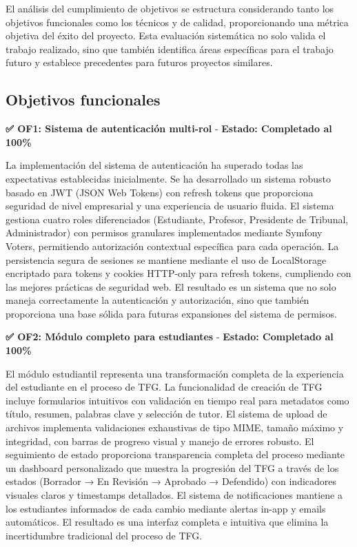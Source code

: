 \documentclass[12pt,a4paper,oneside]{report}
\begin{document}
El análisis del cumplimiento de objetivos se estructura considerando
tanto los objetivos funcionales como los técnicos y de calidad,
proporcionando una métrica objetiva del éxito del proyecto. Esta
evaluación sistemática no solo valida el trabajo realizado, sino que
también identifica áreas específicas para el trabajo futuro y establece
precedentes para futuros proyectos similares.

\subsection{Objetivos funcionales}\label{objetivos-funcionales}

\textbf{✅ OF1: Sistema de autenticación multi-rol} - \textbf{Estado: Completado al 100\%}

La implementación del sistema de autenticación ha superado todas las expectativas establecidas inicialmente. Se ha desarrollado un sistema robusto basado en JWT (JSON Web Tokens) con refresh tokens que proporciona seguridad de nivel empresarial y una experiencia de usuario fluida. El sistema gestiona cuatro roles diferenciados (Estudiante, Profesor, Presidente de Tribunal, Administrador) con permisos granulares implementados mediante Symfony Voters, permitiendo autorización contextual específica para cada operación. La persistencia segura de sesiones se mantiene mediante el uso de LocalStorage encriptado para tokens y cookies HTTP-only para refresh tokens, cumpliendo con las mejores prácticas de seguridad web. El resultado es un sistema que no solo maneja correctamente la autenticación y autorización, sino que también proporciona una base sólida para futuras expansiones del sistema de permisos.

\textbf{✅ OF2: Módulo completo para estudiantes} - \textbf{Estado: Completado al 100\%}

El módulo estudiantil representa una transformación completa de la experiencia del estudiante en el proceso de TFG. La funcionalidad de creación de TFG incluye formularios intuitivos con validación en tiempo real para metadatos como título, resumen, palabras clave y selección de tutor. El sistema de upload de archivos implementa validaciones exhaustivas de tipo MIME, tamaño máximo y integridad, con barras de progreso visual y manejo de errores robusto. El seguimiento de estado proporciona transparencia completa del proceso mediante un dashboard personalizado que muestra la progresión del TFG a través de los estados (Borrador → En Revisión → Aprobado → Defendido) con indicadores visuales claros y timestamps detallados. El sistema de notificaciones mantiene a los estudiantes informados de cada cambio mediante alertas in-app y emails automáticos. El resultado es una interfaz completa e intuitiva que elimina la incertidumbre tradicional del proceso de TFG.
\end{document}

